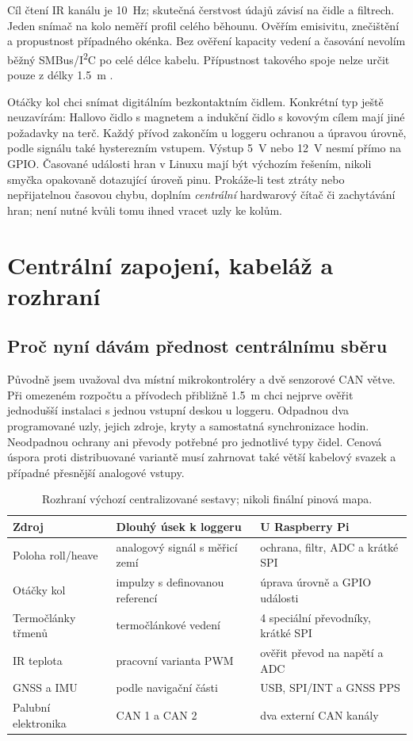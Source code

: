 Cíl čtení IR kanálu je \SI{10}{Hz}; skutečná čerstvost údajů závisí
na čidle a filtrech. Jeden snímač na kolo neměří profil celého běhounu.
Ověřím emisivitu, znečištění a propustnost případného okénka.
Bez ověření kapacity vedení a časování nevolím běžný SMBus/I\textsuperscript{2}C
po celé délce kabelu. Přípustnost takového spoje nelze určit pouze
z délky \SI{1.5}{m} \cite{nxp-i2c-adc}.

Otáčky kol chci snímat digitálním bezkontaktním čidlem. Konkrétní typ
ještě neuzavírám: Hallovo čidlo s magnetem a indukční čidlo s kovovým
cílem mají jiné požadavky na terč. Každý přívod zakončím u loggeru
ochranou a úpravou úrovně, podle signálu také hysterezním vstupem.
Výstup \SI{5}{V} nebo \SI{12}{V} nesmí přímo na GPIO. Časované
události hran v Linuxu mají být výchozím řešením, nikoli smyčka
opakovaně dotazující úroveň pinu. Prokáže-li test ztráty nebo
nepřijatelnou časovou chybu, doplním \emph{centrální} hardwarový čítač
či zachytávání hran; není nutné kvůli tomu ihned vracet uzly ke kolům.

\section{Centrální zapojení, kabeláž a rozhraní}

\subsection{Proč nyní dávám přednost centrálnímu sběru}

Původně jsem uvažoval dva místní mikrokontroléry a dvě senzorové CAN
větve. Při omezeném rozpočtu a přívodech přibližně \SI{1.5}{m} chci
nejprve ověřit jednodušší instalaci s jednou vstupní deskou u loggeru.
Odpadnou dva programované uzly, jejich zdroje, kryty a samostatná
synchronizace hodin. Neodpadnou ochrany ani převody potřebné pro
jednotlivé typy čidel. Cenová úspora proti distribuované variantě musí
zahrnovat také větší kabelový svazek a případné přesnější analogové vstupy.

\begin{table}[htbp]
\centering\small
\caption{Rozhraní výchozí centralizované sestavy; nikoli finální pinová mapa.}
\label{tab:centralni-rozhrani}
\begin{tabularx}{\textwidth}{@{}L{34mm}L{43mm}Y@{}}
\toprule
Zdroj & Dlouhý úsek k loggeru & U Raspberry Pi \\
\midrule
Poloha roll/heave & analogový signál s měřicí zemí & ochrana, filtr, ADC a krátké SPI \\
Otáčky kol & impulzy s definovanou referencí & úprava úrovně a GPIO události \\
Termočlánky třmenů & termočlánkové vedení & 4 speciální převodníky, krátké SPI \\
IR teplota & pracovní varianta PWM & ověřit převod na napětí a ADC \\
GNSS a IMU & podle navigační části & USB, SPI/INT a GNSS PPS \\
Palubní elektronika & CAN 1 a CAN 2 & dva externí CAN kanály \\
\bottomrule
\end{tabularx}
\end{table}

